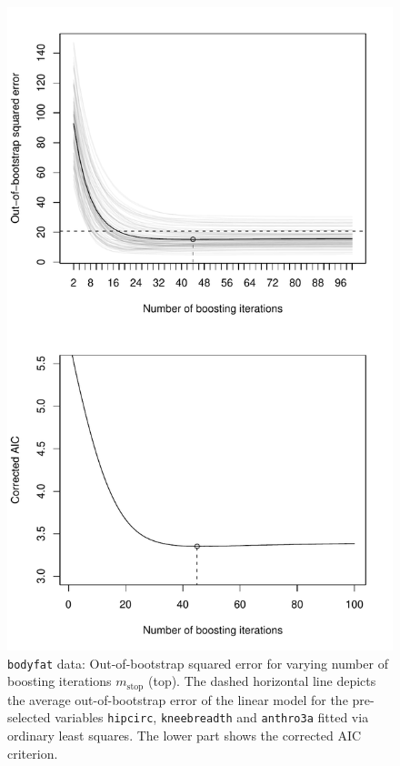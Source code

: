 \documentclass{article}
\newcommand{\Robject}[1]{\texttt{#1}}
\begin{document}
\begin{figure}
\begin{center}
\includegraphics{figures/bodyfat_glmboost-bodyfat-oob-plot.pdf}
\caption{\Robject{bodyfat} data: Out-of-bootstrap squared error for varying
  number of  
         boosting iterations $m_\text{stop}$ (top). The dashed horizontal line
         depicts the average out-of-bootstrap error of the linear model 
         for the pre-selected variables \Robject{hipcirc},
         \Robject{kneebreadth}  
         and \Robject{anthro3a} fitted via ordinary least squares. 
         The lower part shows the corrected AIC criterion.
         \label{bodyfat-oob-plot}}
\end{center}
\end{figure}
\end{document}
